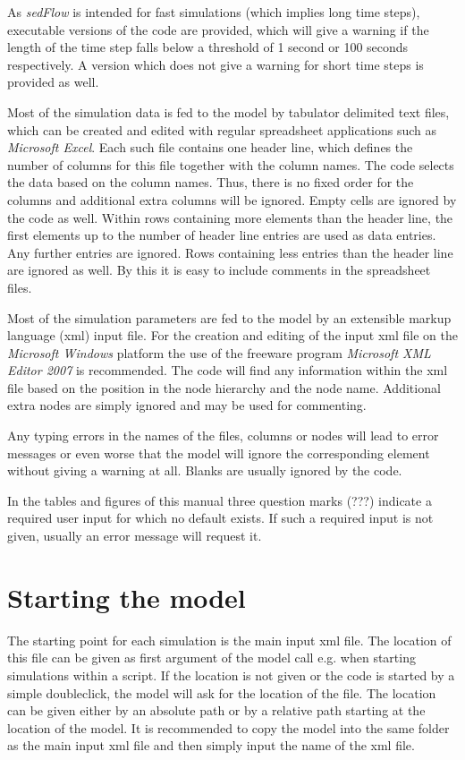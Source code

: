\documentclass[11pt,a4paper]{article}
\begin{document}
As \emph{sedFlow} is intended for fast simulations (which implies long time steps), executable versions of the code are provided, which will give a warning if the length of the time step falls below a threshold of 1 second or 100 seconds respectively. A version which does not give a warning for short time steps is provided as well.

Most of the simulation data is fed to the model by tabulator delimited text files, which can be created and edited with regular spreadsheet applications such as \emph{Microsoft Excel}. Each such file contains one header line, which defines the number of columns for this file together with the column names. The code selects the data based on the column names. Thus, there is no fixed order for the columns and additional extra columns will be ignored. Empty cells are ignored by the code as well. Within rows containing more elements than the header line, the first elements up to the number of header line entries are used as data entries. Any further entries are ignored. Rows containing less entries than the header line are ignored as well. By this it is easy to include comments in the spreadsheet files.

Most of the simulation parameters are fed to the model by an extensible markup language (xml) input file. For the creation and editing of the input xml file on the \emph{Microsoft Windows} platform the use of the freeware program \emph{Microsoft XML Editor 2007} is recommended. The code will find any information within the xml file based on the position in the node hierarchy and the node name. Additional extra nodes are simply ignored and may be used for commenting.

Any typing errors in the names of the files, columns or nodes will lead to error messages or even worse that the model will ignore the corresponding element without giving a warning at all. Blanks are usually ignored by the code.

In the tables and figures of this manual three question marks (???) indicate a required user input for which no default exists. If such a required input is not given, usually an error message will request it.

\section{Starting the model}\label{StartingTheModel}
The starting point for each simulation is the main input xml file. The location of this file can be given as first argument of the model call e.g. when starting simulations within a script. If the location is not given or the code is started by a simple doubleclick, the model will ask for the location of the file. The location can be given either by an absolute path or by a relative path starting at the location of the model. It is recommended to copy the model into the same folder as the main input xml file and then simply input the name of the xml file.
\end{document}
